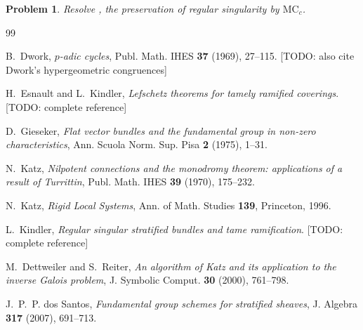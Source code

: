 \documentclass[11pt,reqno]{amsart}
\newcommand{\TODO}[1]{{\color{red}\textsf{[TODO: #1]}}}
\newcommand{\MC}{\mathrm{MC}}
\theoremstyle{plain}
\newtheorem{problem}[theorem]{Problem}
\theoremstyle{definition}
\theoremstyle{remark}
\numberwithin{equation}{section}
\begin{document}
\begin{problem}
Resolve , the preservation of regular singularity by
$\MC_c$.
\end{problem}

\begin{thebibliography}{99}

 B.~Dwork,
  \emph{$p$-adic cycles}, Publ. Math. IHES \textbf{37} (1969), 27--115.
  \TODO{also cite Dwork's hypergeometric congruences}

 H.~Esnault and L.~Kindler,
  \emph{Lefschetz theorems for tamely ramified coverings}.
  \TODO{complete reference}

 D.~Gieseker,
  \emph{Flat vector bundles and the fundamental group in non-zero
  characteristics}, Ann. Scuola Norm. Sup. Pisa \textbf{2} (1975), 1--31.

 N.~Katz,
  \emph{Nilpotent connections and the monodromy theorem: applications of a
  result of Turrittin}, Publ. Math. IHES \textbf{39} (1970), 175--232.

 N.~Katz,
  \emph{Rigid Local Systems}, Ann. of Math. Studies \textbf{139},
  Princeton, 1996.

 L.~Kindler,
  \emph{Regular singular stratified bundles and tame ramification}.
  \TODO{complete reference}

 M.~Dettweiler and S.~Reiter,
  \emph{An algorithm of Katz and its application to the inverse Galois
  problem}, J. Symbolic Comput. \textbf{30} (2000), 761--798.

 J.~P.~P. dos Santos,
  \emph{Fundamental group schemes for stratified sheaves},
  J. Algebra \textbf{317} (2007), 691--713.

\end{thebibliography}
\end{document}
